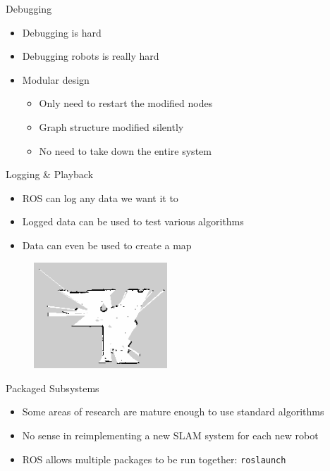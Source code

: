 \documentclass{beamer}
\begin{document}
\begin{frame}{Debugging}
  \begin{itemize}
  \item Debugging is hard \pause
  \item Debugging robots is really hard \pause
  \item Modular design
    \begin{itemize}
    \item Only need to restart the modified nodes
    \item Graph structure modified silently
    \item No need to take down the entire system
    \end{itemize}
  \end{itemize}
\end{frame}

\begin{frame}{Logging \& Playback}
  \begin{itemize}
  \item ROS can log any data we want it to \pause
  \item Logged data can be used to test various algorithms \pause
  \item Data can even be used to create a map
  \end{itemize}

  \begin{figure}
    \includegraphics[width=5cm]{map.png}
  \end{figure}
\end{frame}

\begin{frame}{Packaged Subsystems}
  \begin{itemize}
  \item Some areas of research are mature enough to use standard
    algorithms
  \item No sense in reimplementing a new SLAM system for each new
    robot
  \item ROS allows multiple packages to be run together: \texttt{roslaunch}
  \end{itemize}
\end{frame}
\end{document}
